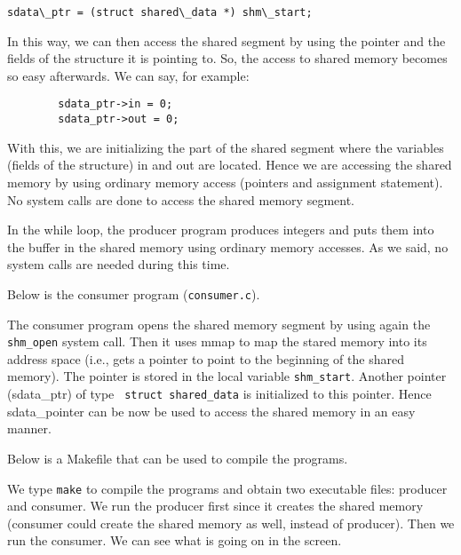 \begin{Verbatim}  
sdata\_ptr = (struct shared\_data *) shm\_start;
\end{Verbatim} 

In this way, we can then access the shared segment by using the
pointer and the fields of the structure it is pointing to. So, the
access to shared memory becomes so easy afterwards. We can say, for
example:

\begin{Verbatim}
        sdata_ptr->in = 0;
        sdata_ptr->out = 0;
\end{Verbatim} 

With this, we are initializing the part of the shared segment where
the variables (fields of the structure) in and out are located. Hence
we are accessing the shared memory by using ordinary memory access
(pointers and assignment statement). No system calls are done to
access the shared memory segment.

In the while loop, the producer program produces integers and puts
them into the buffer in the shared memory using ordinary memory
accesses.  As we said, no system calls are needed during this time.

Below is the consumer program ({\tt consumer.c}).


The consumer program opens the shared memory segment by using again
the {\tt shm\_open} system call. Then it uses mmap to map the stared
memory into its address space (i.e., gets a pointer to point to the
beginning of the shared memory). The pointer is stored in the local
variable {\tt shm\_start}. Another pointer (sdata\_ptr) of type {\tt
  struct shared\_data} is initialized to this pointer. Hence
sdata\_pointer can be now be used to access the shared memory in an
easy manner.

Below is a Makefile that can be used to compile the programs.


We type {\tt make} to compile the programs and obtain two executable
files: producer and consumer. We run the producer first since it
creates the shared memory (consumer could create the shared memory as
well, instead of producer). Then we run the consumer. We can see what
is going on in the screen.

